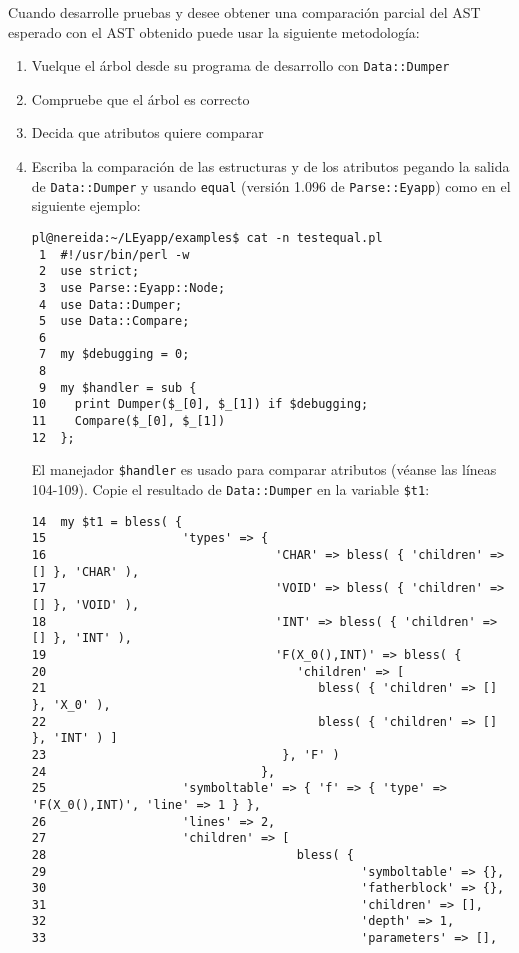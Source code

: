 
Cuando desarrolle pruebas y desee obtener una comparación parcial  del AST esperado 
con el AST obtenido puede usar la siguiente metodología:
\begin{enumerate}
\item
Vuelque el árbol desde su programa de desarrollo con \verb|Data::Dumper|
\item
Compruebe que el árbol es correcto
\item
Decida que atributos quiere comparar
\item
Escriba la comparación de las estructuras y de los atributos 
pegando la salida de \verb|Data::Dumper| y usando \verb|equal|
(versión 1.096 de \verb|Parse::Eyapp|) como en el siguiente ejemplo:
\begin{verbatim}
pl@nereida:~/LEyapp/examples$ cat -n testequal.pl
 1  #!/usr/bin/perl -w
 2  use strict;
 3  use Parse::Eyapp::Node;
 4  use Data::Dumper;
 5  use Data::Compare;
 6
 7  my $debugging = 0;
 8
 9  my $handler = sub {
10    print Dumper($_[0], $_[1]) if $debugging;
11    Compare($_[0], $_[1])
12  };
\end{verbatim}
El manejador \verb|$handler| es usado para comparar atributos 
(véanse las líneas 104-109).
Copie el resultado de \verb|Data::Dumper| en la variable \verb|$t1|:
\begin{verbatim}
14  my $t1 = bless( {
15                   'types' => {
16                                'CHAR' => bless( { 'children' => [] }, 'CHAR' ),
17                                'VOID' => bless( { 'children' => [] }, 'VOID' ),
18                                'INT' => bless( { 'children' => [] }, 'INT' ),
19                                'F(X_0(),INT)' => bless( {
20                                   'children' => [
21                                      bless( { 'children' => [] }, 'X_0' ),
22                                      bless( { 'children' => [] }, 'INT' ) ]
23                                 }, 'F' )
24                              },
25                   'symboltable' => { 'f' => { 'type' => 'F(X_0(),INT)', 'line' => 1 } },
26                   'lines' => 2,
27                   'children' => [
28                                   bless( {
29                                            'symboltable' => {},
30                                            'fatherblock' => {},
31                                            'children' => [],
32                                            'depth' => 1,
33                                            'parameters' => [],

\end{verbatim}
\end{enumerate}

